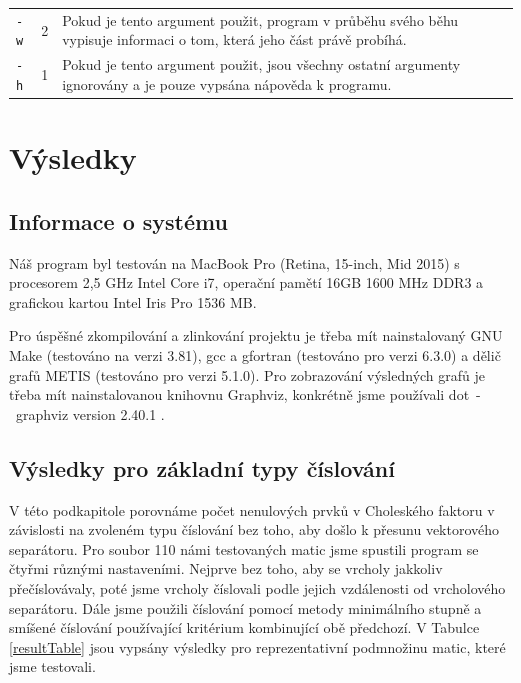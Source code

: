 \documentclass{ctuthesis}
\theoremstyle{plain}
\theoremstyle{definition}
\begin{document}
{\begin{tabular}{|l|c|p{8cm}|}
  \texttt{-w}& 2 & Pokud je tento argument použit, program v průběhu svého běhu vypisuje informaci o tom, která jeho část právě probíhá. \\
  \texttt{-h}& 1 & Pokud je tento argument použit, jsou všechny ostatní argumenty ignorovány a je pouze vypsána nápověda k programu. \\
  \hline
\end{tabular}
}

\chapter{Výsledky}

\section{Informace o systému}
Náš program byl testován na MacBook Pro (Retina, 15-inch, Mid 2015) s procesorem 2,5 GHz Intel Core i7, operační pamětí 16GB 1600 MHz DDR3 a grafickou kartou Intel Iris Pro 1536 MB.

Pro úspěšné zkompilování a zlinkování projektu je třeba mít nainstalovaný GNU Make (testováno na verzi 3.81), gcc a gfortran (testováno pro verzi 6.3.0) a dělič grafů METIS (testováno pro verzi 5.1.0). Pro zobrazování výsledných grafů je třeba mít nainstalovanou knihovnu Graphviz, konkrétně jsme používali dot~-~graphviz version 2.40.1 \cite{graphviz}.

\section{Výsledky pro základní typy číslování}
\label{numberingResultsSection}
V této podkapitole porovnáme počet nenulových prvků v Choleského faktoru v závislosti na zvoleném typu číslování bez toho, aby došlo k přesunu vektorového separátoru. Pro soubor 110 námi testovaných matic jsme spustili program se čtyřmi různými nastaveními. Nejprve bez toho, aby se vrcholy jakkoliv přečíslovávaly, poté jsme vrcholy číslovali podle jejich vzdálenosti od vrcholového separátoru. Dále jsme použili číslování pomocí metody minimálního stupně a smíšené číslování používající kritérium kombinující obě předchozí. V Tabulce \ref{resultTable} jsou vypsány výsledky pro reprezentativní podmnožinu matic, které jsme testovali. 
\end{document}
